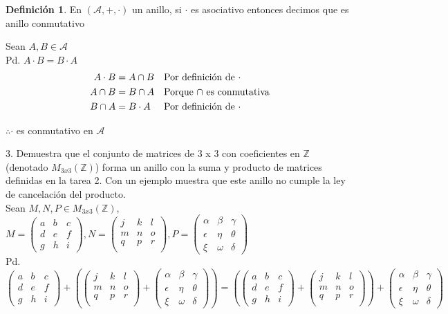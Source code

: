 \documentclass[letterpaper]{article}
\newcommand{\A}{\mathcal{A}}
\newcommand{\Nmat}{\begin{pmatrix}
		j & k & l\\
		m & n & o\\
		q & p & r\\
\end{pmatrix}}
\newcommand{\Pmat}{\begin{pmatrix}
		\alpha & \beta & \gamma\\
		\epsilon & \eta & \theta\\
		\xi & \omega & \delta
\end{pmatrix}}
\newcommand{\Mmat}{\begin{pmatrix}
		a & b & c\\
		d & e & f\\
		g & h & i
\end{pmatrix}}
\newcommand{\mtt}{M_{3x3}(\mathds{Z})}
\newcommand{\Z}{\mathds{Z}}
\renewcommand{\*}{\cdot}
\theoremstyle{definition}
\newtheorem{definition}{Definición}
\begin{document}
\begin{definition}
	En $ (\A, +, \*) $ un anillo, si $ \* $ es asociativo entonces decimos que es anillo conmutativo
\end{definition}
Sean $ A,B \in \A $\\
Pd. $ A\*B = B\* A $
\begin{align*}
	A\*B &= A \cap B && \text{Por definición de $ \* $}\\
	A \cap B &= B \cap A  && \text{Porque $ \cap $ es conmutativa}\\
	B \cap A &= B \* A  && \text{Por definición de $ \* $}
\end{align*}
\begin{center}
	$ \therefore \* $ es conmutativo en $ \A $
\end{center}
3. Demuestra que el conjunto de matrices de 3 x 3 con coeficientes en $ \mathbb{Z} $ (denotado $ M_{3x3}(\Z) $) forma un anillo con la suma y producto de matrices definidas en la tarea 2. Con un ejemplo muestra que este anillo no cumple la ley de cancelación del producto.\\
Sean $ M, N, P \in \mtt $, $ M = \begin{pmatrix}
a & b & c\\
d & e & f\\
g & h & i
\end{pmatrix} , N = \begin{pmatrix}
 j & k & l\\
 m & n & o\\
 q & p & r\\
\end{pmatrix}, P = \begin{pmatrix}
\alpha & \beta & \gamma\\
\epsilon & \eta & \theta\\
\xi & \omega & \delta
\end{pmatrix}$\\
Pd. $ \Mmat + \left(\Nmat + \Pmat \right) = \left(\Mmat + \Nmat \right) + \Pmat $
\end{document}
